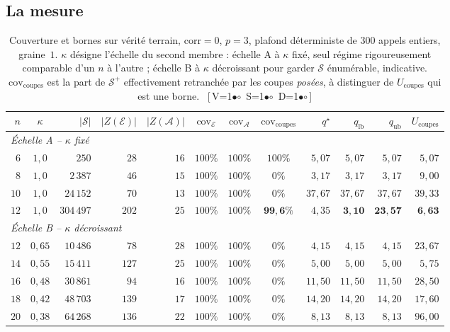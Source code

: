 \documentclass[11pt,a4paper]{article}
\theoremstyle{plain}
\theoremstyle{remark}
\newcommand{\Ecal}{\mathcal{E}}
\newcommand{\Scal}{\mathcal{S}}
\newcommand{\Acal}{\mathcal{A}}
\newcommand{\qs}{q^{\star}}
\newcommand{\cfgm}[1]{\ifnum#1=1$\bullet$\else$\circ$\fi}
\newcommand{\conf}[3]{%
  \textsf{\footnotesize[\,V\cfgm{#1}\ S\cfgm{#2}\ D\cfgm{#3}\,]}}
\begin{document}
\subsection{La mesure}

\begin{table}[H]
\centering
\caption{Couverture et bornes sur vérité terrain, $\text{corr}=0$, $p=3$,
plafond déterministe de $300$ appels entiers, graine~$1$. $\kappa$ désigne
l'échelle du second membre : échelle A à $\kappa$ fixé, seul régime
rigoureusement comparable d'un $n$ à l'autre ; échelle B à $\kappa$
décroissant pour garder $\Scal$ énumérable, indicative.
$\text{cov}_{\text{coupes}}$ est la part de $\Scal^{+}$ effectivement
retranchée par les coupes \emph{posées}, à distinguer de $U_{\text{coupes}}$
qui est une borne.\ \conf{1}{1}{1}}
\label{tab:couverture}
\setlength{\tabcolsep}{3.5pt}\small
\begin{tabular}{rcrrrcccrrrr}
\toprule
$n$ & $\kappa$ & $|\Scal|$ & $|Z(\Ecal)|$ & $|Z(\Acal)|$
 & $\text{cov}_{\Ecal}$ & $\text{cov}_{\Acal}$ & $\text{cov}_{\text{coupes}}$
 & $\qs$ & $q_{\text{lb}}$ & $q_{\text{ub}}$ & $U_{\text{coupes}}$\\
\midrule
\multicolumn{12}{l}{\emph{Échelle A -- $\kappa$ fixé}}\\
$6$  & $1{,}0$ & $250$    & $28$  & $16$ & $100\%$ & $100\%$ & $100\%$ & $5{,}07$ & $5{,}07$ & $5{,}07$ & $5{,}07$\\
$8$  & $1{,}0$ & $2\,387$ & $46$  & $15$ & $100\%$ & $100\%$ & $0\%$ & $3{,}17$ & $3{,}17$ & $3{,}17$ & $9{,}00$\\
$10$ & $1{,}0$ & $24\,152$& $70$  & $13$ & $100\%$ & $100\%$ & $0\%$ & $37{,}67$& $37{,}67$ & $37{,}67$& $39{,}33$\\
$12$ & $1{,}0$ & $304\,497$&$202$ & $25$ & $100\%$ & $100\%$ & $\mathbf{99{,}6\%}$ & $4{,}35$ & $\mathbf{3{,}10}$ & $\mathbf{23{,}57}$ & $\mathbf{6{,}63}$\\
\midrule
\multicolumn{12}{l}{\emph{Échelle B -- $\kappa$ décroissant}}\\
$12$ & $0{,}65$& $10\,486$& $78$  & $28$ & $100\%$ & $100\%$ & $0\%$ & $4{,}15$ & $4{,}15$ & $4{,}15$ & $23{,}67$\\
$14$ & $0{,}55$& $15\,411$& $127$ & $25$ & $100\%$ & $100\%$ & $0\%$ & $5{,}00$ & $5{,}00$ & $5{,}00$ & $5{,}75$\\
$16$ & $0{,}48$& $30\,861$& $94$  & $16$ & $100\%$ & $100\%$ & $0\%$ & $11{,}50$& $11{,}50$& $11{,}50$& $28{,}50$\\
$18$ & $0{,}42$& $48\,703$& $139$ & $17$ & $100\%$ & $100\%$ & $0\%$ & $14{,}20$& $14{,}20$& $14{,}20$& $17{,}60$\\
$20$ & $0{,}38$& $64\,268$& $136$ & $22$ & $100\%$ & $100\%$ & $0\%$ & $8{,}13$ & $8{,}13$& $8{,}13$ & $96{,}00$\\
\bottomrule
\end{tabular}
\end{table}
\end{document}
